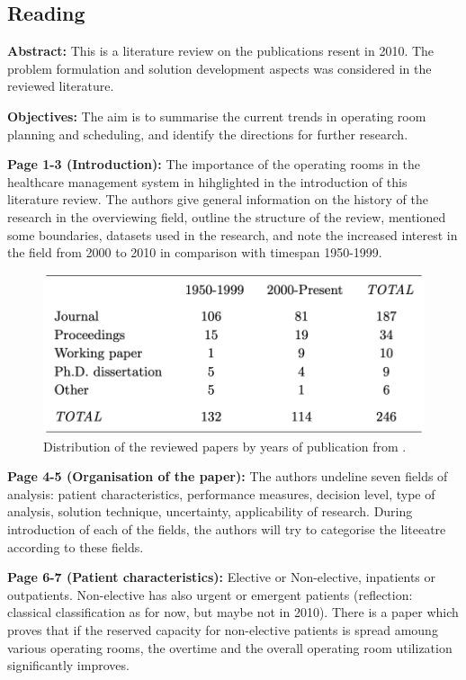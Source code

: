 \subsection{Reading}
    \textbf{Abstract:}
    This is a literature review on the publications resent in 2010. The problem formulation and solution development aspects was considered in the reviewed literature.
    
    \textbf{Objectives:}
    The aim is to summarise the current trends in operating room planning and scheduling, and identify the directions for further research.
    
    \textbf{Page 1-3 (Introduction):}
    The importance of the operating rooms in the healthcare management system in hihglighted in the introduction of this literature review. The authors give general information on the history of the research in the overviewing field, outline the structure of the review, mentioned some boundaries, datasets used in the research, and note the increased interest in the field from 2000 to 2010 in comparison with timespan 1950-1999. 
    \begin{figure}[H]
        \centering
        \includegraphics[width=1\textwidth]{figures/0020_SR01BE10/fig1.png}
        \caption{Distribution of the reviewed papers by years of publication from \cite{x228}.}
        \label{fig1:0020_SR01BE10}
    \end{figure}
    
    \textbf{Page 4-5 (Organisation of the paper):}
    The authors undeline seven fields of analysis: patient characteristics, performance measures, decision level, type of analysis, solution technique, uncertainty, applicability of research. During introduction of each of the fields, the authors will try to categorise the liteeatre according to these fields.

    \textbf{Page 6-7 (Patient characteristics):} 
    Elective or Non-elective, inpatients or outpatients. Non-elective has also urgent or emergent patients (reflection: classical classification as for now, but maybe not in 2010). There is a paper which proves that if the reserved capacity for non-elective patients is spread amoung various operating rooms, the overtime and the overall operating room utilization significantly improves.
    
